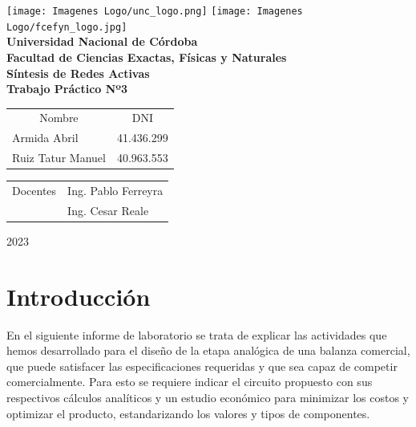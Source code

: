 \documentclass[12pt,A4paper,titlepage]{article}
\begin{document}
\begin{titlepage}

\thispagestyle{empty}


\begin{center}
    \texttt{[image: Imagenes Logo/unc\_logo.png]}
    \texttt{[image: Imagenes Logo/fcefyn\_logo.jpg]}
    \\[1cm]
    \vspace{5pt}
    \LARGE \textbf{Universidad Nacional de Córdoba}\\[0.5cm] 
    \large \textbf{Facultad de Ciencias Exactas, Físicas y Naturales} \\[0.5cm] 
    \large \textbf{Síntesis de Redes Activas}
    \\[0.5cm]
    \large \textbf{Trabajo Práctico Nº3}\\[0.5cm]
    \vspace{60pt}
    \begin{table}[!h]
    \centering
    \begin{tabular}{ll}
    \multicolumn{1}{c}{Nombre} & \multicolumn{1}{c}{DNI} \\
    Armida Abril & 41.436.299  \\
    Ruiz Tatur Manuel & 40.963.553
    \end{tabular}
    \end{table}
    \vspace{20pt}
    \begin{table}[!h]
    \centering
    \begin{tabular}{ll}
    \multicolumn{1}{c}{Docentes} & Ing. Pablo Ferreyra \\
     & Ing. Cesar Reale \\
     
    \end{tabular}
    \end{table}
    \vspace{20pt}
    \large 2023
\end{center}

\end{titlepage}

\newpage
\section{Introducción}
\hspace{1mm} 
En el siguiente informe de laboratorio se trata de explicar las actividades que hemos desarrollado para el diseño de la etapa analógica de una balanza comercial, que puede satisfacer las especificaciones requeridas y que sea capaz de competir comercialmente. Para esto se requiere indicar el circuito propuesto con sus respectivos cálculos analíticos y un estudio económico para minimizar los costos y optimizar el producto, estandarizando los valores y tipos de componentes.
\end{document}

